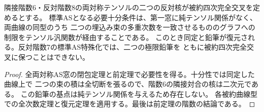 \begin{corollary}[階数8の被約反対核に対する判定]\label{cor:all-reduced-apolar-recognition}
隣接階数6・反対階数8の両対称テンソルの二つの反対核が被約四次完全交叉を定めるとする。
標準ASとなる必要十分条件は、第一窓に純テンソル関係がなく、両曲線の同型のうち
二つの埋込み束の多重次数を一致させるもののグラフへの制限をテンソル汎関数が経由することである。
このとき同定と鉛筆が復元される。反対階数7の標準AS特殊化では、二つの極限鉛筆を
ともに被約四次完全交叉に保つことはできない。
\end{corollary}
\begin{proof}
全両対称AS窓の閉包定理と前定理で必要性を得る。十分性では同定した曲線上で
二つの束の積は全切断を張るので、階数6の隣接対合の核は二次元である。
この鉛筆の基点は純テンソル関係を与えるため存在しない。
各被約曲線型での全次数定理と復元定理を適用する。最後は前定理の階数の結論である。
\end{proof}
